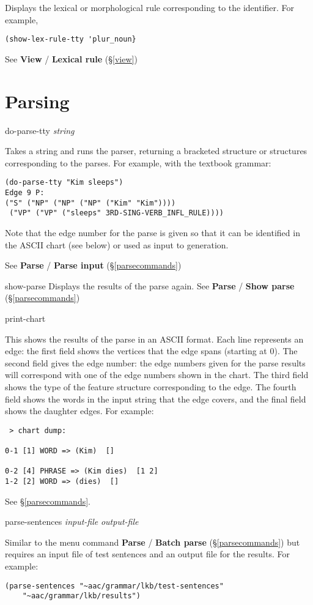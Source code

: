 \documentclass[12pt]{report}
\newcommand{\lispcommand}[1]{\noindent\rm #1}%
\begin{document}
Displays the lexical or
morphological rule corresponding to the identifier.
For example,
\begin{verbatim}
(show-lex-rule-tty 'plur_noun}
\end{verbatim}
See {\bf View} / {\bf Lexical rule} (\S\ref{view})

\section{Parsing}

\lispcommand{do-parse-tty {\it string}}

Takes a string and runs the parser, returning a bracketed 
structure or structures corresponding to the parses.
For example, with the textbook grammar:
\begin{verbatim}
(do-parse-tty "Kim sleeps")
Edge 9 P:
("S" ("NP" ("NP" ("NP" ("Kim" "Kim"))))
 ("VP" ("VP" ("sleeps" 3RD-SING-VERB_INFL_RULE))))
\end{verbatim}
Note that the edge number for the parse is given so that it
can be identified in the ASCII chart (see below) or used
as input to generation.

See {\bf Parse} / {\bf Parse input} (\S\ref{parsecommands})

\lispcommand{show-parse}
Displays the results of the parse again.
See {\bf Parse} / {\bf Show parse} (\S\ref{parsecommands})

\lispcommand{print-chart}

This shows the results of the parse in an ASCII format.
Each line represents an edge:
the first field shows the vertices that the
edge spans (starting at 0).  The second field
gives the edge number: the edge numbers given for the
parse results will correspond with one of the edge numbers
shown in the chart.  The third field shows the type of the
feature structure corresponding to the edge.
The fourth field shows the words in the input string that the
edge covers, and the final field shows the daughter edges.
For example:
\begin{verbatim}
 > chart dump:

0-1 [1] WORD => (Kim)  []

0-2 [4] PHRASE => (Kim dies)  [1 2]
1-2 [2] WORD => (dies)  []
\end{verbatim}

See \S\ref{parsecommands}.

\lispcommand{parse-sentences {\it input-file} {\it output-file}}

Similar to the menu command {\bf Parse} / {\bf Batch parse}
 (\S\ref{parsecommands}) but requires an input file of test sentences
and an output file for the results.  For example:
\begin{verbatim}
(parse-sentences "~aac/grammar/lkb/test-sentences" 
    "~aac/grammar/lkb/results")
\end{verbatim}
\end{document}
